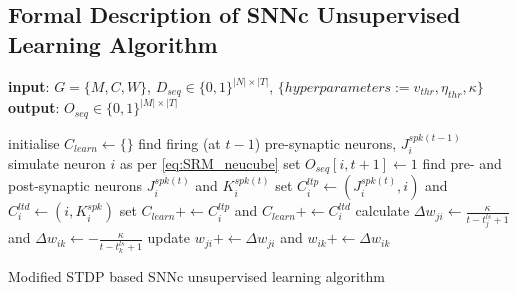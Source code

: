\subsection{Formal Description of SNNc Unsupervised Learning Algorithm}
\label{sec:neucube_snnc_learning}
\begin{algorithm}
	\begin{algorithmic}[1]
		\STATE \textbf{input}: $G=\{M, C, W\}$, $D_{seq}\in \{0,1\}^{|N|\times |T|}$, $\{hyperparameters:=v_{thr}, \eta_{thr}, \kappa\}$
		\STATE \textbf{output}: $O_{seq} \in \{0, 1\}^{|M|\times |T|}$
		
		\STATE initialise $C_{learn}\leftarrow\{\}$
		\STATE find firing (at $t-1$) pre-synaptic neurons, $J_i^{spk(t-1)}$
		\STATE simulate neuron $i$ as per \equationname \ref{eq:SRM_neucube}
		\STATE set $O_{seq}[i, t+1]\leftarrow 1$
		\STATE find pre- and post-synaptic neurons $J_i^{spk(t)}$ and $K_i^{spk(t)}$
		\STATE set $C_i^{ltp}\leftarrow (J_i^{spk(t)}, i)$ and $C_i^{ltd}\leftarrow (i, K_i^{spk})$
		\STATE set $C_{learn}+\leftarrow C_i^{ltp}$ and $C_{learn}+\leftarrow C_i^{ltd}$
		\ENDIF
		\ENDFOR
		\STATE calculate $\Delta w_{ji}\leftarrow \frac{\kappa}{t-t_j^{ls}+1}$ and $\Delta w_{ik}\leftarrow -\frac{\kappa}{t-t_k^{ls}+1}$
		\STATE update $w_{ji}+\leftarrow \Delta w_{ji}$ and $w_{ik}+\leftarrow \Delta w_{ik}$
		\ENDFOR
		\ENDFOR
		\caption{Modified STDP based SNNc unsupervised learning algorithm}
		\label{alg:unsup_mod_stdp}
	\end{algorithmic}
\end{algorithm}

